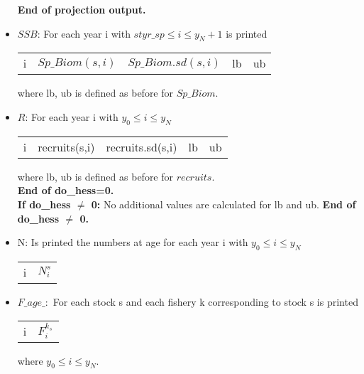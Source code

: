 \documentclass{article}
\begin{document}
\begin{itemize}
\textbf{End of  projection output.}

\item $SSB$: For each year i with $styr\_sp \leq i \leq y_N+1$ is printed 
\begin{center}
    \begin{tabular}{c c c c c }
        i & $Sp\_Biom(s,i)$  &  $Sp\_Biom.sd(s,i)$ & lb & ub\\
          
    \end{tabular}
\end{center}
where lb, ub is defined as before for $Sp\_Biom$.

\item $R$: For each year i with $y_0\leq i \leq y_N$

\begin{center}
    \begin{tabular}{c c c c c}
      i   & recruits(s,i) &  recruits.sd(s,i) & lb & ub\\

    \end{tabular}
\end{center}
where lb, ub is defined as before for $recruits$.\\

\textbf{End of do\_hess=0.}\\

\textbf{If do\_hess $\neq$ 0:} No additional values are calculated for lb and ub. \textbf{End of do\_hess $\neq$ 0.}\\

\item N: Is printed the numbers at age for each year i with $y_0\leq i \leq y_N$

\begin{center}
    \begin{tabular}{c c}
        i & $N^s_{i}$ \\
    \end{tabular}
\end{center}

\item $F\_age\_:$ For each stock s and each fishery k corresponding to stock s is printed
\begin{center}
    \begin{tabular}{c c}
        i & $F^{k_s}_i$ \\
    \end{tabular}
\end{center}
where $y_0\leq i \leq y_N$.
   

\end{itemize}
\end{document}

